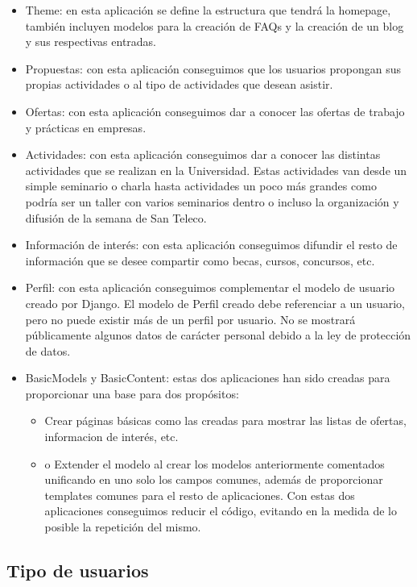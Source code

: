 \begin{itemize}
\item Theme: en esta aplicación se define la estructura que tendrá la homepage, también incluyen modelos para la creación de FAQs y la creación de un blog y sus respectivas entradas.
\item Propuestas: con esta aplicación conseguimos que los usuarios propongan sus propias actividades o al tipo de actividades que desean asistir.
\item Ofertas: con esta aplicación conseguimos dar a conocer las ofertas de trabajo y prácticas en empresas.
\item Actividades: con esta aplicación conseguimos dar a conocer las distintas actividades que se realizan en la Universidad. Estas actividades van desde un simple seminario o charla hasta actividades un poco más grandes como podría ser un taller con varios seminarios dentro o incluso la organización y difusión de la semana de San Teleco. 
\item Información de interés: con esta aplicación conseguimos difundir el resto de información que se desee compartir como becas, cursos, concursos, etc. 
\item Perfil: con esta aplicación conseguimos complementar el modelo de usuario creado por Django.
El modelo de Perfil creado debe referenciar a un usuario, pero no puede existir más de un perfil por usuario. 
No se mostrará públicamente algunos datos de carácter personal debido a la ley de protección de datos.
\item BasicModels y BasicContent: estas dos aplicaciones han sido creadas para proporcionar una base para dos propósitos:
\begin{itemize}
\item Crear páginas básicas como las creadas para mostrar las listas de ofertas, informacion de interés, etc.
\item o	Extender el modelo al crear los modelos anteriormente comentados unificando en uno solo los campos comunes, además de proporcionar templates comunes para el resto de aplicaciones.
Con estas dos aplicaciones conseguimos reducir el código, evitando en la medida de lo posible la repetición del mismo.
\end{itemize}
\end{itemize}


\subsection{Tipo de usuarios} 
\label{subsec:usuarios}


